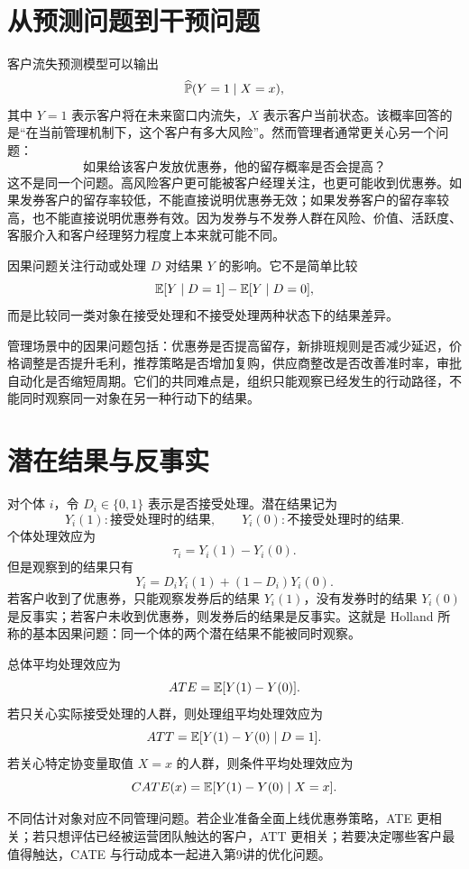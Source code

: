 \documentclass[UTF8,fontset=fandol,openany,zihao=-4]{ctexbook}
\begin{document}
\section{从预测问题到干预问题}

客户流失预测模型可以输出
\[
  \widehat{\mathbb P}(Y=1\mid X=x),
\]
其中 \(Y=1\) 表示客户将在未来窗口内流失，\(X\) 表示客户当前状态。该概率回答的是“在当前管理机制下，这个客户有多大风险”。然而管理者通常更关心另一个问题：
\[
  \text{如果给该客户发放优惠券，他的留存概率是否会提高？}
\]
这不是同一个问题。高风险客户更可能被客户经理关注，也更可能收到优惠券。如果发券客户的留存率较低，不能直接说明优惠券无效；如果发券客户的留存率较高，也不能直接说明优惠券有效。因为发券与不发券人群在风险、价值、活跃度、客服介入和客户经理努力程度上本来就可能不同。

\begin{definition}[因果问题]
因果问题关注行动或处理 \(D\) 对结果 \(Y\) 的影响。它不是简单比较
\[
  \mathbb E[Y\mid D=1]-\mathbb E[Y\mid D=0],
\]
而是比较同一类对象在接受处理和不接受处理两种状态下的结果差异。
\end{definition}

管理场景中的因果问题包括：优惠券是否提高留存，新排班规则是否减少延迟，价格调整是否提升毛利，推荐策略是否增加复购，供应商整改是否改善准时率，审批自动化是否缩短周期。它们的共同难点是，组织只能观察已经发生的行动路径，不能同时观察同一对象在另一种行动下的结果。

\section{潜在结果与反事实}

对个体 \(i\)，令 \(D_i\in\{0,1\}\) 表示是否接受处理。潜在结果记为
\[
  Y_i(1):\text{接受处理时的结果},
  \qquad
  Y_i(0):\text{不接受处理时的结果}.
\]
个体处理效应为
\[
  \tau_i=Y_i(1)-Y_i(0).
\]
但是观察到的结果只有
\[
  Y_i=D_iY_i(1)+(1-D_i)Y_i(0).
\]
若客户收到了优惠券，只能观察发券后的结果 \(Y_i(1)\)，没有发券时的结果 \(Y_i(0)\) 是反事实；若客户未收到优惠券，则发券后的结果是反事实。这就是 Holland 所称的基本因果问题：同一个体的两个潜在结果不能被同时观察。

\begin{definition}[平均处理效应]
总体平均处理效应为
\[
  ATE=\mathbb E[Y(1)-Y(0)].
\]
若只关心实际接受处理的人群，则处理组平均处理效应为
\[
  ATT=\mathbb E[Y(1)-Y(0)\mid D=1].
\]
若关心特定协变量取值 \(X=x\) 的人群，则条件平均处理效应为
\[
  CATE(x)=\mathbb E[Y(1)-Y(0)\mid X=x].
\]
\end{definition}

不同估计对象对应不同管理问题。若企业准备全面上线优惠券策略，ATE 更相关；若只想评估已经被运营团队触达的客户，ATT 更相关；若要决定哪些客户最值得触达，CATE 与行动成本一起进入第9讲的优化问题。
\end{document}
